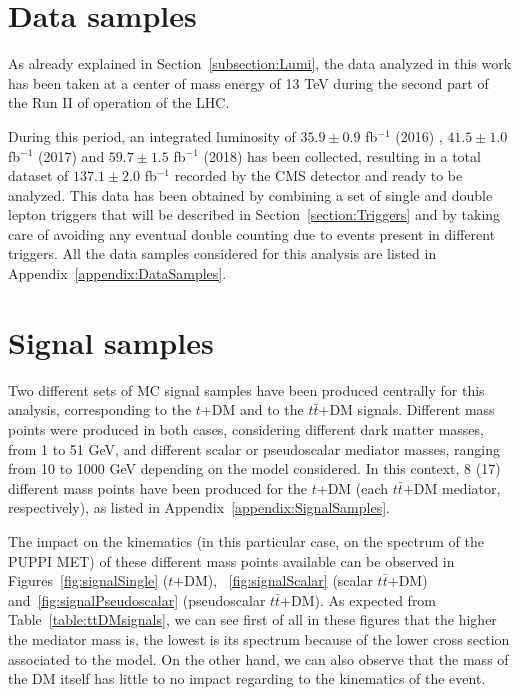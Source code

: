 \documentclass[a4paper, 10pt, openright]{report}
\begin{document}
\section{Data samples} \label{section:Data}

As already explained in Section~\ref{subsection:Lumi}, the data analyzed in this work has been taken at a center of mass energy of 13 TeV during the second part of the Run II of operation of the \ac{LHC}. 

During this period, an integrated luminosity of $35.9 \pm 0.9$ fb$^{-1}$ (2016) \cite{Lumi2016}, $41.5 \pm 1.0$ fb$^{-1}$ (2017) \cite{Lumi2017} and $59.7 \pm 1.5$ fb$^{-1}$ (2018) \cite{Lumi2018} has been collected, resulting in a total dataset of $137.1 \pm 2.0$ fb$^{-1}$ recorded by the \ac{CMS} detector and ready to be analyzed. This data has been obtained by combining a set of single and double lepton triggers that will be described in Section~\ref{section:Triggers} and by taking care of avoiding any eventual double counting due to events present in different triggers. All the data samples considered for this analysis are listed in Appendix~\ref{appendix:DataSamples}.

\section{Signal samples} \label{section:Signals}

Two different sets of \ac{MC} signal samples have been produced centrally for this analysis, corresponding to the $t$+DM and to the $t \bar t$+DM signals. Different mass points were produced in both cases, considering different dark matter masses, from 1 to 51 GeV, and different scalar or pseudoscalar mediator masses, ranging from 10 to 1000 GeV depending on the model considered. In this context, 8 (17) different mass points have been produced for the $t$+DM (each $t \bar t$+DM mediator, respectively), as listed in Appendix~\ref{appendix:SignalSamples}.

The impact on the kinematics (in this particular case, on the spectrum of the \ac{PUPPI} \ac{MET}) of these different mass points available can be observed in Figures~\ref{fig:signalSingle} ($t$+DM), ~\ref{fig:signalScalar} (scalar $t \bar t$+DM) and~\ref{fig:signalPseudoscalar} (pseudoscalar $t \bar t$+DM). As expected from Table~\ref{table:ttDMsignals}, we can see first of all in these figures that the higher the mediator mass is, the lowest is its spectrum because of the lower cross section associated to the model. On the other hand, we can also observe that the mass of the \ac{DM} itself has little to no impact regarding to the kinematics of the event.
\end{document}
